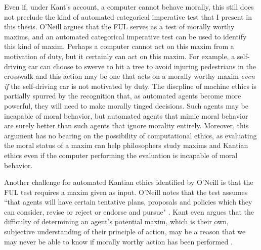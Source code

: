 \begin{isabellebody}
\begin{isamarkuptext}
Even if, under Kant's account, a computer cannot behave morally, this still does not preclude the kind 
of automated categorical imperative test that I present in this thesis. O'Neill argues that the FUL
serves as a test of morally worthy maxims, and an automated categorical imperative test can be used 
to identify this kind of maxim. Perhaps a computer cannot act on this maxim from a motivation of duty, 
but it certainly can act on this maxim. For example, a self-driving car can choose to swerve to hit a tree
to avoid injuring pedestrians in the crosswalk and this action may be one that acts on a morally worthy maxim
\emph{even if} the self-driving car is not motivated by duty. The discpline of machine ethics is partially
spurred by the recognition that, as automated agents become more powerful, they will need to make
morally tinged decisions. Such agents may be incapable of moral behavior, but automated agents that mimic
moral behavior are surely better than such agents that ignore morality entirely. Moreover, this argument
has no bearing on the possibility of computational ethics, as evaluating the moral status of a maxim can 
help philosophers study maxims and Kantian ethics even if the computer performing the evaluation is incapable of 
moral behavior.

Another challenge for automated Kantian ethics identified by O'Neill is that the FUL test requires
a maxim given as input. O'Neill notes that the test assumes ``that agents will have certain tentative 
plans, proposals and policies which they can consider, revise or reject or endorse and pursue" \citep[343]{oneilluniversallaws}.
Kant even argues that the difficulty of determining an agent's potential maxim, which is their
own, subjective understanding of their principle of action, may be a reason that we may never be able 
to know if morally worthy action has been performed \cite[345]{oneilluniversallaw}. 


\end{isamarkuptext}
\end{isabellebody}
